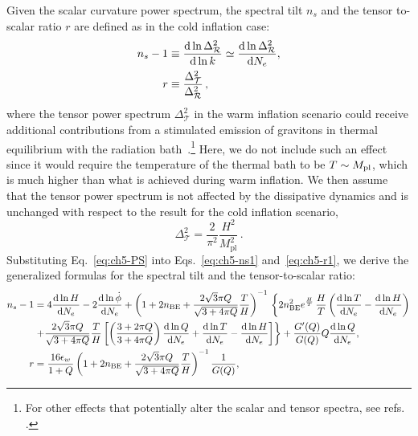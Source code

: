 Given the scalar curvature power spectrum, the spectral tilt $n_s$ and the tensor to-scalar ratio $r$ are defined as in the cold inflation case:
\begin{align}
    n_s-1& \equiv \frac{{\rm d}\ln \Delta^2_{\mathcal{R}}}{{\rm d}\ln k}\simeq \frac{{\rm d}\ln \Delta^2_{\mathcal{R}}}{{\rm d}N_e},\label{eq:ch5-ns1} \\
    r& \equiv \frac{\Delta_{\mathcal{T}}^2}{\Delta^2_{\mathcal{R}}}\,, \label{eq:ch5-r1}
\end{align}
where the tensor power spectrum $\Delta^2_{\mathcal{T}}$ in the warm inflation scenario could receive additional contributions from a stimulated emission of gravitons in thermal equilibrium with the radiation bath~\cite{Bhattacharya:2006dm}.\footnote{For other effects that potentially alter the scalar and tensor spectra, see refs. \cite{Namba:2015gja,Peloso:2016gqs}.} Here, we do not include such an effect since it would require the temperature of the thermal bath to be $T \sim M_{\rm pl}$, which is much higher than what is achieved during warm inflation. We then assume that the tensor power spectrum is not affected by the dissipative dynamics and is unchanged with respect to the result for the cold inflation scenario,
\begin{equation}
    \Delta^2_{\mathcal{T}} = \frac{2}{\pi^2} \frac{H^2}{M_{\mathrm{pl}}^2}\,.
\end{equation}
Substituting Eq.~\ref{eq:ch5-PS} into Eqs.~\ref{eq:ch5-ns1} and~\ref{eq:ch5-r1}, we derive the generalized formulas for the spectral tilt and the tensor-to-scalar ratio:
{\small
\begin{align}
    n_s-1&=4\frac{{\rm d}\ln H}{{\rm d}N_e}-2\frac{{\rm d}\ln \dot{\phi}}{{\rm d}N_e}+\left(1+2 n_{\mathrm{BE}}+\frac{2 \sqrt{3} \pi Q}{\sqrt{3+4 \pi Q}} \frac{T}{H}\right)^{-1}\,\left\{ 2n_{\mathrm{BE}}^2e^{\frac{H}{T}}\,\frac{H}{T}\left(\frac{{\rm d}\ln T}{{\rm d}N_e}-\frac{{\rm d}\ln H}{{\rm d}N_e}\right)\right. \nonumber \\
    &\left. +\frac{2 \sqrt{3} \pi Q}{\sqrt{3+4 \pi Q}} \frac{T}{H}\left[ \left(\frac{3+2\pi Q}{3+4\pi Q}\right)\frac{{\rm d}\ln Q}{{\rm d}N_e}+\frac{{\rm d}\ln T}{{\rm d}N_e}-\frac{{\rm d}\ln H}{{\rm d}N_e}\right]\right\} +\frac{ G^\prime(Q)}{G(Q)}Q\frac{{\rm d}\ln Q}{{\rm d}N_e}, \label{eq:ch5-ns2}\\
     r&=\frac{16 \epsilon_{w}}{1+Q}\left(1+2 n_{\mathrm{BE}}+\frac{2 \sqrt{3} \pi Q}{\sqrt{3+4 \pi Q}} \frac{T}{H}\right)^{-1} \frac{1}{G(Q)}, \label{eq:ch5-r2}
\end{align}
}

